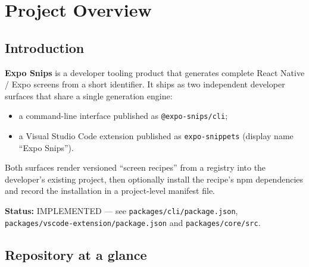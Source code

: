 \chapter{Project Overview}
\label{ch:project-overview}

\section{Introduction}

\textbf{Expo Snips} is a developer tooling product that generates complete
React Native / Expo screens from a short identifier. It ships as two independent
developer surfaces that share a single generation engine:

\begin{itemize}
  \item a command-line interface published as \texttt{@expo-snips/cli};
  \item a Visual Studio Code extension published as \texttt{expo-snippets}
        (display name ``Expo Snips'').
\end{itemize}

Both surfaces render versioned ``screen recipes'' from a registry into the
developer's existing project, then optionally install the recipe's npm
dependencies and record the installation in a project-level manifest file.

\textbf{Status:} IMPLEMENTED --- see \texttt{packages/cli/package.json},
\texttt{packages/vscode-extension/package.json} and \texttt{packages/core/src}.

\section{Repository at a glance}

